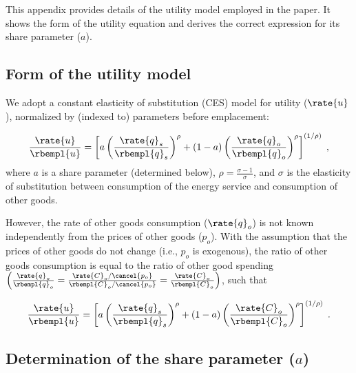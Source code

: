 
This appendix provides details of the utility model employed in the paper.
It shows the form of the utility equation and
derives the correct expression for its share parameter ($a$).


\subsection{Form of the utility model}
\label{sec:utility_model_form}

We adopt a constant elasticity of substitution (CES) model for utility ($\rate{u}$),
normalized by (indexed to) parameters before emplacement:

\begin{equation}
  \frac{\rate{u}}{\rbempl{u}} = 
  \left[ a \left( \frac{\rate{q}_s}{\rbempl{q}_s} \right)^\rho 
        + (1-a) \left( \frac{\rate{q}_o}{\rbempl{q}_o} \right)^\rho  \right]^{(1/\rho)} \; ,
\end{equation}
%
where $a$ is a share parameter (determined below),
$\rho = \frac{\sigma - 1}{\sigma}$, and 
$\sigma$ is the elasticity of substitution between
consumption of the energy service and 
consumption of other goods.

However, the rate of other goods consumption ($\rate{q}_o$)
is not known independently from the prices of other goods ($p_o$).
With the assumption that the prices of other goods do not change
(i.e., $p_o$ is exogenous), 
the ratio of other goods consumption is equal to the ratio of other good spending
$\left( \frac{\rate{q}_o}{\rbempl{q}_o} = \frac{\rate{C}_o/\cancel{p_o}}{\rbempl{C}_o/\cancel{p_o}} = \frac{\rate{C}_o}{\rbempl{C}_o} \right)$, such that

\begin{equation} \label{eq:ces_utility_with_a}
  \frac{\rate{u}}{\rbempl{u}} = 
  \left[ a \left( \frac{\rate{q}_s}{\rbempl{q}_s} \right)^\rho 
        + (1-a) \left( \frac{\rate{C}_o}{\rbempl{C}_o} \right)^\rho  \right]^{(1/\rho)} \; .
\end{equation}


\subsection{Determination of the share parameter ($a$)}
\label{sec:share_parameter_derivation}

